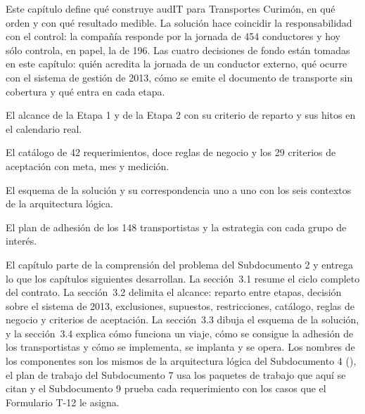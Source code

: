 
\begin{resumenApertura}
Este capítulo define qué construye audIT para Transportes Curimón, en qué orden y con qué resultado
medible. La solución hace coincidir la responsabilidad con el control: la compañía responde por la
jornada de 454 conductores y hoy sólo controla, en papel, la de 196. Las cuatro decisiones de fondo
están tomadas en este capítulo: quién acredita la jornada de un conductor externo, qué ocurre con el
sistema de gestión de 2013, cómo se emite el documento de transporte sin cobertura y qué entra en
cada etapa.
\begin{recibe}
  \item El alcance de la Etapa 1 y de la Etapa 2 con su criterio de reparto y sus hitos en el calendario real.
  \item El catálogo de 42 requerimientos, doce reglas de negocio y los 29 criterios de aceptación con meta, mes y medición.
  \item El esquema de la solución y su correspondencia uno a uno con los seis contextos de la arquitectura lógica.
  \item El plan de adhesión de los 148 transportistas y la estrategia con cada grupo de interés.
\end{recibe}
\end{resumenApertura}

El capítulo parte de la comprensión del problema del Subdocumento 2 y entrega lo que los capítulos
siguientes desarrollan. La sección~3.1 resume el ciclo completo del contrato. La sección~3.2 delimita
el alcance: reparto entre etapas, decisión sobre el sistema de 2013, exclusiones, supuestos,
restricciones, catálogo, reglas de negocio y criterios de aceptación. La sección~3.3 dibuja el esquema
de la solución, y la sección~3.4 explica cómo funciona un viaje, cómo se consigue la adhesión de los
transportistas y cómo se implementa, se implanta y se opera. Los nombres de los componentes son los
mismos de la arquitectura lógica del Subdocumento 4 (), el plan de trabajo
del Subdocumento 7 usa los paquetes de trabajo que aquí se citan y el Subdocumento 9 prueba cada
requerimiento con los casos que el Formulario T-12 le asigna.


